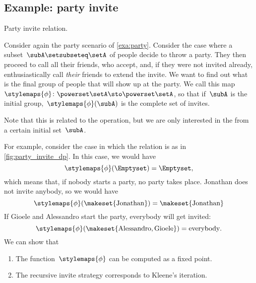 \subsection{Example: party invite}

\begin{marginfigure}
    \caption{Party invite relation.}
    \label{fig:party_invite_dp}
\end{marginfigure}

Consider again the party scenario of \cref{exa:party}.
Consider the case where a subset~$\subA \setsubseteq \setA$ of people decide to throw a party.
They then proceed to call all their friends, who accept, and,
if they were not invited already, enthusiastically call \emph{their} friends to extend the invite.
We want to find out what is the final group of people that will show up at the party.
We call this map~$\stylemaps{\phi} \colon \powerset \setA \sto \powerset \setA$, so that if~$\subA$ is the initial group,~$\stylemaps{\phi}(\subA)$ is the complete set of invites.

Note that this is related to the  operation, but we are only interested in the  from a certain initial set~$\subA$.

For example, consider the case in which the relation is as in \cref{fig:party_invite_dp}.
In this case, we would have
\begin{equation}
    \stylemaps{\phi}(\Emptyset) = \Emptyset,
\end{equation}
which means that, if nobody starts a party, no party takes place.
Jonathan does not invite anybody, so we would have
\begin{equation}
    \stylemaps{\phi}(\makeset{\text{Jonathan}}) = \makeset{\text{Jonathan}}
\end{equation}
If Gioele and Alessandro start the party, everybody will get invited:
\begin{equation}
    \stylemaps{\phi}(\makeset{\text{Alessandro}, \text{Gioele}}) = \text{everybody}.
\end{equation}
%
We can show that
\begin{enumerate}
    \item The function~$\stylemaps{\phi}$ can be computed as a fixed point.
    \item The recursive invite strategy corresponds to Kleene's iteration.
\end{enumerate}

